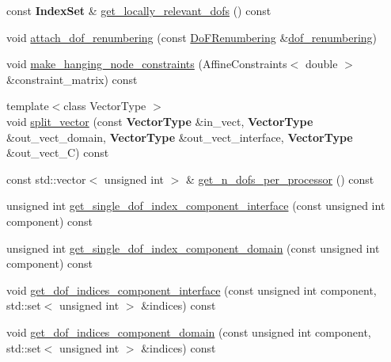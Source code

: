 \begin{DoxyCompactItemize}
\item 
const {\bf Index\+Set} \& \hyperlink{class_do_f_handler_system_a15566db3dbb5d3ab2e4732354432f56e}{get\+\_\+locally\+\_\+relevant\+\_\+dofs} () const 
\item 
void \hyperlink{class_do_f_handler_system_ab31e887efe0c3703e3a777287c250ed0}{attach\+\_\+dof\+\_\+renumbering} (const \hyperlink{class_do_f_renumbering}{Do\+F\+Renumbering} \&\hyperlink{class_do_f_handler_system_aef6159c606a24ac7daadcd3fe082b3b6}{dof\+\_\+renumbering})
\item 
void \hyperlink{class_do_f_handler_system_a8708acd1db19ae6965e885ebbe11d262}{make\+\_\+hanging\+\_\+node\+\_\+constraints} (Affine\+Constraints$<$ double $>$ \&constraint\+\_\+matrix) const 
\item 
{\footnotesize template$<$class Vector\+Type $>$ }\\void \hyperlink{class_do_f_handler_system_abe00061acc73a319e705939ed965018d}{split\+\_\+vector} (const {\bf Vector\+Type} \&in\+\_\+vect, {\bf Vector\+Type} \&out\+\_\+vect\+\_\+domain, {\bf Vector\+Type} \&out\+\_\+vect\+\_\+interface, {\bf Vector\+Type} \&out\+\_\+vect\+\_\+C) const 
\item 
const std\+::vector$<$ unsigned int $>$ \& \hyperlink{class_do_f_handler_system_a741d168ac52d3591d687736a7a4f6dd6}{get\+\_\+n\+\_\+dofs\+\_\+per\+\_\+processor} () const 
\item 
unsigned int \hyperlink{class_do_f_handler_system_a0acf8d35c183ac73bb445e3bac3dd59a}{get\+\_\+single\+\_\+dof\+\_\+index\+\_\+component\+\_\+interface} (const unsigned int component) const 
\item 
unsigned int \hyperlink{class_do_f_handler_system_aa25553114a5cbe59607b8b9df2162c3e}{get\+\_\+single\+\_\+dof\+\_\+index\+\_\+component\+\_\+domain} (const unsigned int component) const 
\item 
void \hyperlink{class_do_f_handler_system_a8c17d9da864812987d06258a29a6bd11}{get\+\_\+dof\+\_\+indices\+\_\+component\+\_\+interface} (const unsigned int component, std\+::set$<$ unsigned int $>$ \&indices) const 
\item 
void \hyperlink{class_do_f_handler_system_ac92b8ae730634afbf300a10de8d360e1}{get\+\_\+dof\+\_\+indices\+\_\+component\+\_\+domain} (const unsigned int component, std\+::set$<$ unsigned int $>$ \&indices) const 
\end{DoxyCompactItemize}
